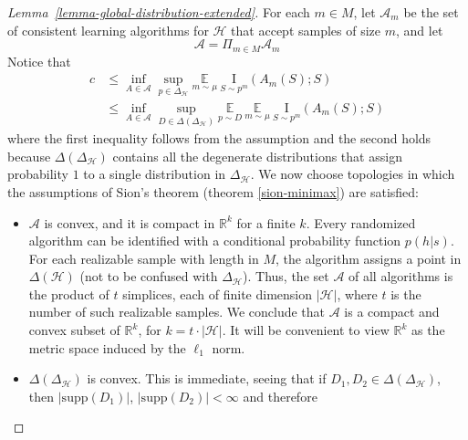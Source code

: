 \documentclass[final,12pt]{colt2018}
\newcommand{\EE}[1]{\underset{#1}{\mathbb{E}}}
\newcommand{\mc}[1]{\mathcal{#1}}
\newcommand{\mb}{\mathbb}
\newcommand{\cH}{\mc{H}}
\newcommand{\cA}{\mc{A}}
\newcommand{\cS}{\mc{S}}
\newcommand{\I}[2]{\underset{#1}{\mathrm{I}}\left(#2\right)}
\newcommand{\supp}{\mathrm{supp}}
\begin{document}
\begin{proof}[Lemma~\ref{lemma-global-distribution-extended}]
	For each $m\in M$, let $\cA_m$ be the set of consistent learning algorithms for $\cH$ that accept samples of size $m$, and let
	\[
	\cA = \Pi_{m \in M} \cA_m
	\]
	Notice that
	\begin{align*}
	c & \leq \inf_{A\in\cA}\sup_{p\in\Delta_{\cH}} \EE{m \sim \mu} \: \I{S \sim p^m}{A_m(S);S} \\
	& \leq \inf_{A\in\cA}\sup_{D\in\Delta(\Delta_{\cH})} \EE{p \sim D} \: \EE{m \sim \mu} \: \I{S \sim p^m}{A_m(S);S}
	\end{align*}
	where the first inequality follows from the assumption and the second holds because $\Delta(\Delta_{\cH})$ contains all the degenerate distributions that assign probability $1$ to a single distribution in $\Delta_{\cH}$. We now choose topologies in which the assumptions of Sion's theorem (theorem \ref{sion-minimax}) are satisfied:
	\begin{itemize}
		\item{
			$\cA$ is convex, and it is compact in $\mb{R}^k$ for a finite $k$. Every randomized algorithm can be identified with a conditional probability function $p(h|s)$. For each realizable sample with length in $M$, the algorithm assigns a point in $\Delta(\cH)$ (not to be confused with $\Delta_\cH$). Thus, the set $\cA$ of all algorithms is the product of $t$ simplices, each of finite dimension $|\cH|$, where $t$ is the number of such realizable samples. We conclude that $\cA$ is a compact and convex subset of $\mb{R}^k$, for $k=t\cdot|\cH|$. It will be convenient to view $\mb{R}^k$ as the metric space induced by the $\ell_1$ norm.
		}
		\item{
			$\Delta(\Delta_{\cH})$ is convex. This is immediate, seeing that if $D_1,D_2 \in \Delta(\Delta_{\cH})$, then $|\supp(D_1)|$, $|\supp(D_2)| < \infty$ and therefore
}
\end{itemize}
\end{proof}
\end{document}
